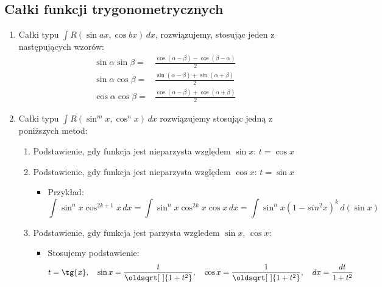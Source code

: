 \documentclass[10pt, twoside, fleqn]{article}
\renewcommand*{\sqrt}[2][\ ]{\oldsqrt[#1]{#2}}
\begin{document}
		\vspace{40pt}

	\subsection{Całki funkcji trygonometrycznych}


			\begin{enumerate}

			\item Całki typu $ \displaystyle \int{R( \sin{ax} , \cos{bx} )\,dx} $, rozwiązujemy, stosując jeden z następujących wzorów:
				\begin{equation*}
					\begin{split}
		 				\sin\alpha\sin\beta = &
		 					\frac{\cos(\alpha-\beta)-\cos(\beta-\alpha)}{2} \\
						\sin\alpha\cos\beta = &
							\frac{\sin(\alpha-\beta)+\sin(\alpha+\beta)}{2} \\
						\cos\alpha\cos\beta = &
							\frac{\cos(\alpha-\beta)+\cos(\alpha+\beta)}{2} 
					\end{split}
				\end{equation*}


			\item Całki typu $ \displaystyle \int{R( \sin^m x , \cos^n x )\,dx} $ rozwiązujemy stosując jedną z poniższych metod:
			\begin{enumerate}				
			
			\item Podstawienie, gdy funkcja jest nieparzysta względem $ \sin x $: $ t=\cos x $
			\item Podstawienie, gdy funkcja jest nieparzysta względem $ \cos x $: $ t=\sin x $
				\begin{itemize} 
					\item Przykład:
						\begin{equation*}
							\int{\sin^nx \cos^{2k+1}}x\,dx = 
							\int{\sin^nx \cos^{2k}x \cos x\,dx}= 
							\int{\sin^nx(1-sin^2x)^k\,d(\sin x)}
						\end{equation*}
				\end{itemize}				
				
			\item Podstawienie, gdy funkcja jest parzysta wzgledem $ \sin x $, $ \cos x $:
						
		\begin{itemize}
			\item Stosujemy podstawienie:
						\begin{equation*}
							t=\tg{x}, \hspace{10pt}  
							\sin x = \frac{t}{\sqrt{1+t^2}}, \hspace{10pt} 
							\cos x=\frac{1}{\sqrt{1+t^2}}, \hspace{10pt}  
							dx=\frac{dt}{1+t^2}
						\end{equation*}
						

\end{itemize}
\end{enumerate}
\end{enumerate}
\end{document}
